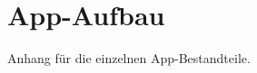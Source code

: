 \renewcommand{\thesection}{\Alph{section}}
\setcounter{figure}{0}
\renewcommand{\thefigure}{\Alph{section}.\arabic{figure}}
\appendix
{}

\captionsetup{list=false}

\section{App-Aufbau}
Anhang für die einzelnen App-Bestandteile.